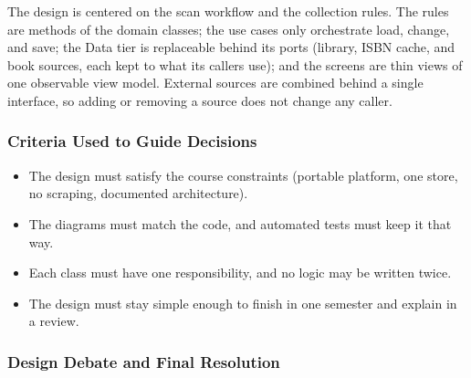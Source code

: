 \documentclass[12pt]{article}
\begin{document}
The design is centered on the scan workflow and the collection rules. The rules are methods of the domain classes; the use cases only orchestrate load, change, and save; the Data tier is replaceable behind its ports (library, ISBN cache, and book sources, each kept to what its callers use); and the screens are thin views of one observable view model. External sources are combined behind a single interface, so adding or removing a source does not change any caller.

\subsubsection{Criteria Used to Guide Decisions}

\begin{itemize}
    \item The design must satisfy the course constraints (portable platform, one store, no scraping, documented architecture).
    \item The diagrams must match the code, and automated tests must keep it that way.
    \item Each class must have one responsibility, and no logic may be written twice.
    \item The design must stay simple enough to finish in one semester and explain in a review.
\end{itemize}

\subsubsection{Design Debate and Final Resolution}
\end{document}
